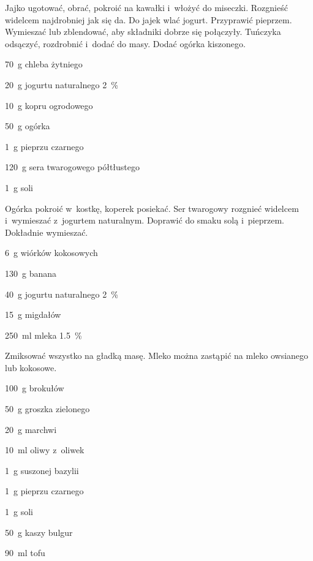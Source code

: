 \documentclass[../main.tex]{subfiles}
\begin{document}
Jajko ugotować, obrać, pokroić na kawałki i~włożyć do miseczki. Rozgnieść
widelcem najdrobniej jak się da. Do jajek wlać jogurt. Przyprawić pieprzem.
Wymieszać lub zblendować, aby składniki dobrze się połączyły. Tuńczyka
odsączyć, rozdrobnić i~dodać do masy. Dodać ogórka kiszonego.


\begin{Ingred}
    \item \qty{70}{\gram} chleba żytniego
    \item \qty{20}{\gram} jogurtu naturalnego \qty{2}{\percent}
    \item \qty{10}{\gram} kopru ogrodowego
    \item \qty{50}{\gram} ogórka
    \item \qty{1}{\gram} pieprzu czarnego
    \item \qty{120}{\gram} sera twarogowego półtłustego
    \item \qty{1}{\gram} soli
\end{Ingred}

Ogórka pokroić w~kostkę, koperek posiekać. Ser twarogowy rozgnieć widelcem
i~wymieszać z~jogurtem naturalnym. Doprawić do smaku solą i~pieprzem. Dokładnie
wymieszać.


\begin{Ingred}
    \item \qty{6}{\gram} wiórków kokosowych
    \item \qty{130}{\gram} banana
    \item \qty{40}{\gram} jogurtu naturalnego \qty{2}{\percent}
    \item \qty{15}{\gram} migdałów
    \item \qty{250}{\milli\litre} mleka \qty{1.5}{\percent}
\end{Ingred}

Zmiksować wszystko na gładką masę. Mleko można zastąpić na mleko owsianego lub
kokosowe.


\begin{Ingred}
    \item \qty{100}{\gram} brokułów
    \item \qty{50}{\gram} groszka zielonego
    \item \qty{20}{\gram} marchwi
    \item \qty{10}{\milli\litre} oliwy z~oliwek
    \item \qty{1}{\gram} suszonej bazylii
    \item \qty{1}{\gram} pieprzu czarnego
    \item \qty{1}{\gram} soli
    \item \qty{50}{\gram} kaszy bulgur
    \item \qty{90}{\milli\litre} tofu
\end{Ingred}
\end{document}
